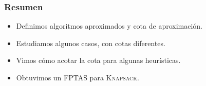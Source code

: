 \documentclass[english, spanish, fleqn,%
hyperref = {colorlinks, urlcolor = blue}%
]{beamer}
\begin{document}
\begin{frame}
  \setcounter{beamerpauses}{2}
  \frametitle{Resumen}

  \begin{itemize}
  \item
    Definimos algoritmos aproximados y cota de aproximación.
  \item
    Estudiamos algunos casos,
    con cotas diferentes.
  \item
    Vimos cómo acotar la cota para algunas heurísticas.
  \item
    Obtuvimos un FPTAS para \textsc{Knapsack}.
  \end{itemize}

\end{frame}
\end{document}
